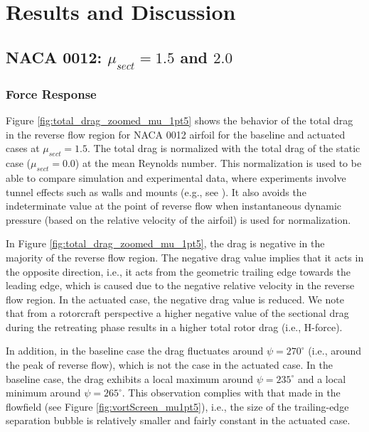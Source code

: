 \section{Results and Discussion}

\subsection{NACA 0012: $\mu_{sect} = 1.5$ and $2.0$}

\subsubsection{Force Response}

Figure \ref{fig:total_drag_zoomed_mu_1pt5} shows the behavior of the total drag in the reverse flow region for NACA 0012 airfoil for the baseline and actuated cases at $\mu_{sect}=1.5$. The total drag is normalized with the total drag of the static case ($\mu_{sect}=0.0$) at the mean Reynolds number. 
This normalization is used to be able to compare simulation and experimental data, where experiments involve tunnel effects such as walls and mounts (e.g., see \cite{bib:kocher2017}).
It also avoids the indeterminate value at the point of reverse flow when instantaneous dynamic pressure (based on the relative velocity of the airfoil) is used for normalization.

In Figure \ref{fig:total_drag_zoomed_mu_1pt5}, the drag is negative in the majority of the reverse flow region.
The negative drag value implies that it acts in the opposite direction, i.e., it acts from the geometric trailing edge towards the leading edge, which is caused due to the negative relative velocity in the reverse flow region.
In the actuated case, the negative drag value is reduced.
We note that from a rotorcraft perspective a higher negative value of the sectional drag during the retreating phase results in a higher total rotor drag (i.e., H-force).

In addition, in the baseline case the drag fluctuates around $\psi=270^\circ$ (i.e., around the peak of reverse flow), which is not the case in the actuated case.
In the baseline case, the drag exhibits a local maximum around $\psi=235^\circ$ and a local minimum around $\psi=265^\circ$.
This observation complies with that made in the flowfield (see Figure \ref{fig:vortScreen_mu1pt5}), i.e., the size of the trailing-edge separation bubble is relatively smaller and fairly constant in the actuated case.

